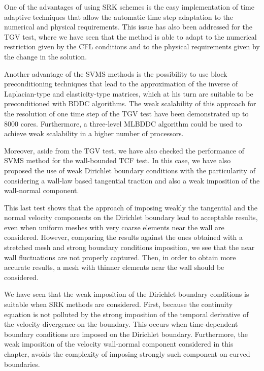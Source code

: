 One of the advantages of using SRK schemes is the easy implementation of time adaptive techniques that allow the automatic time step adaptation to the numerical and physical requirements. This issue has also been addressed for the TGV test, where we have seen that the method is able to adapt to the numerical restriction given by the CFL conditions and to the physical requirements given by the change in the solution.

Another advantage of the SVMS methods is the possibility to use block preconditioning techniques that lead to the approximation of the inverse of Laplacian-type and elasticity-type matrices, which at his turn are suitable to be preconditioned with BDDC algorithms. The weak scalability of this approach for the resolution of one time step of the TGV test have been demonstrated up to 8000 cores. Furthermore, a three-level MLBDDC algorithm could be used to achieve weak scalability in a higher number of processors.

Moreover, aside from the TGV test, we have also checked the performance of SVMS method for the wall-bounded TCF test. In this case, we have also proposed the use of weak Dirichlet boundary conditions with the particularity of considering a wall-law based tangential traction and also a weak imposition of the wall-normal component.

This last test shows that the approach of imposing weakly the tangential and the normal velocity components on the Dirichlet boundary lead to acceptable results, even when uniform meshes with very coarse elements near the wall are considered. However, comparing the results against the ones obtained with a stretched mesh and strong boundary conditions imposition, we see that the near wall fluctuations are not properly captured. Then, in order to obtain more accurate results, a mesh with thinner elements near the wall should be considered.

We have seen that the weak imposition of the Dirichlet boundary conditions is suitable when SRK methods are considered. First, because the continuity equation is not polluted by the strong imposition of the temporal derivative of the velocity divergence on the boundary. This occurs when time-dependent boundary conditions are imposed on the Dirichlet boundary. Furthermore, the weak imposition of the velocity wall-normal component considered in this chapter, avoids the complexity of imposing strongly such component on curved boundaries.